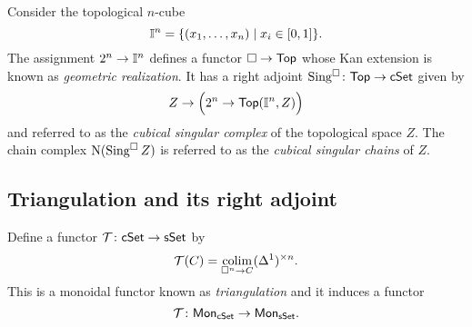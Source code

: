 Consider the topological $n$-cube
\begin{equation*}
\mathbb{I}^{n} = \{(x_1, \dots, x_n) \mid x_i \in [0,1]\}.
\end{equation*}
The assignment $2^n \to \mathbb{I}^n$ defines a functor $\square \to \mathsf{Top}$ whose Kan extension is known as \textit{geometric realization}.
It has a right adjoint $\operatorname{Sing^{\square}} \colon \mathsf{Top} \to \mathsf{cSet}$ given by
\begin{equation*}
Z \to \Big(2^n \to \mathsf{Top}(\mathbb{I}^n, Z)\Big)
\end{equation*}
and referred to as the \textit{cubical singular complex} of the topological space $Z$.
The chain complex $\operatorname{N}(\operatorname{Sing^{\square}} Z)$ is referred to as the \textit{cubical singular chains} of $Z$.

\subsection{Triangulation and its right adjoint} \label{ss:triangulation and its adjoint}


Define a functor $\mathcal{T} \colon \mathsf{cSet} \to \mathsf{sSet}$ by $$\mathcal{T}(C) = \operatorname*{colim}_{\square^n \to C} (\Delta^1)^{\times n}.$$
This is a monoidal functor known as \textit{triangulation} and it induces a functor $$\mathcal{T} \colon \mathsf{Mon}_{\mathsf{cSet}} \to \mathsf{Mon}_{\mathsf{sSet}}.$$


